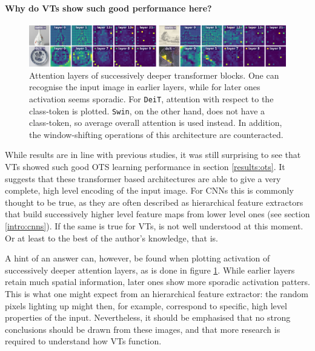 \paragraph{Why do VTs show such good performance here?}

\begin{figure}[tb]
    \includegraphics[width=\textwidth]{img/layers.png}
    \caption{Attention layers of successively deeper transformer blocks. One can recognise the input image in earlier layers, while for later ones activation seems sporadic. For \texttt{DeiT}, attention with respect to the class-token is plotted. \texttt{Swin}, on the other hand, does not have a class-token, so average overall attention is used instead. In addition, the window-shifting operations of this architecture are counteracted.}
    \label{results:img:layers}
\end{figure}

While results are in line with previous studies, it was still surprising to see that VTs showed such good OTS learning performance in section \ref{results:ots}. It suggests that these transformer based architectures are able to give a very complete, high level encoding of the input image. For CNNs this is commonly thought to be true, as they are often described as hierarchical feature extractors that build successively higher level feature maps from lower level ones (see section \ref{intro:cnns}). If the same is true for VTs, is not well understood at this moment. Or at least to the best of the author's knowledge, that is.

A hint of an answer can, however, be found when plotting activation of successively deeper attention layers, as is done in figure \ref{results:img:layers}. While earlier layers retain much spatial information, later ones show more sporadic activation patters. This is what one might expect from an hierarchical feature extractor: the random pixels lighting up might then, for example, correspond to specific, high level properties of the input. Nevertheless, it should be emphasised that no strong conclusions should be drawn from these images, and that more research is required to understand how VTs function.

